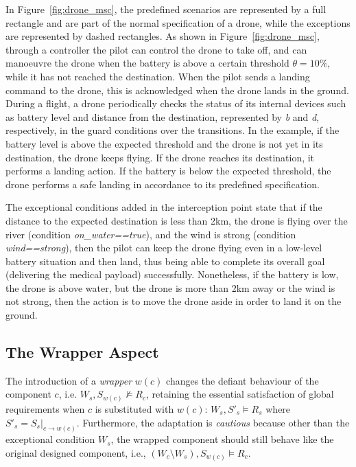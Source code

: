 In Figure~\ref{fig:drone_msc}, the predefined scenarios are represented by a full rectangle and are part of the normal specification of a drone, while the exceptions are represented by dashed rectangles. As shown in Figure~\ref{fig:drone_msc}, through a controller the pilot can control the drone to take off, and can manoeuvre the drone when the battery is above a certain threshold $\theta = 10\%$, while it has not reached the destination. When the pilot sends a landing command to the drone, this is acknowledged when the drone lands in the ground.  During a flight, a drone periodically checks the status of its internal devices such as battery level and distance from the destination, represented by \textit{b} and \textit{d}, respectively, in the guard conditions over the transitions. In the example, if the battery level is above the expected threshold and the drone is not yet in its destination, the drone keeps flying. If the drone reaches its destination, it performs a landing action. If the battery is below the expected threshold, the drone performs a safe landing in accordance to its predefined specification. 

The exceptional conditions added in the interception point state that if the distance to the expected destination is less than 2km, the drone is flying over the river (condition \textit{on\_water==true}), and the wind is strong (condition \textit{wind==strong}), then the pilot can keep the drone flying even in a low-level battery situation and then land, thus being able to complete its overall goal (delivering the medical payload) successfully. Nonetheless, if the battery is low, the drone is above water, but the drone is more than 2km away or the wind is not strong,
then the action is to move the drone aside in order to land it on the ground. 


\subsection{The Wrapper Aspect}
The introduction of a {\it wrapper} $w(c)$ changes the defiant behaviour of the component $c$, i.e. $W_s, S_{w(c)} \not \models R_c$, retaining the essential satisfaction of global requirements when $c$ is substituted with $w(c)$:  $W_s, S'_s \models R_s$ where $S'_s = S_s |_{c \rightarrow w(c)}$. Furthermore, the adaptation is {\it cautious} because other than the exceptional condition $W_s$, the wrapped component should still behave like the original designed component, i.e., $(W_c \setminus W_s), S_{w(c)} \models R_c$. 

